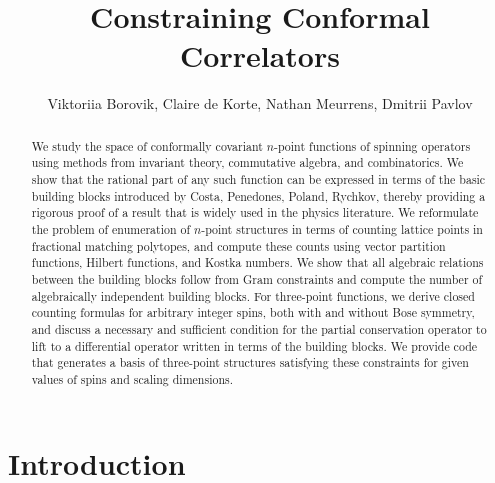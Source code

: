 \documentclass[12pt,a4paper]{extarticle}
\title{\bf Constraining Conformal Correlators}
\author{Viktoriia Borovik, Claire de Korte, Nathan Meurrens, Dmitrii Pavlov}
\date{}
\theoremstyle{definition}
\begin{document}
\maketitle
\begin{abstract}
We study the space of 
conformally covariant 
$n$-point functions of spinning ope\-rators using methods from invariant theory, commutative algebra, and combinatorics. We show that the rational part of any such function can be expressed in terms of the basic building blocks introduced by Costa, Penedones, Poland, Rychkov, thereby providing  a rigorous proof of a result 
that is widely used in the physics literature. We 
reformulate the problem of enumeration of 
$n$-point structures in terms of counting lattice points in fractional matching polytopes, and compute these counts using vector partition functions, Hilbert functions, and Kostka numbers. 
We show that all algebraic relations between the building blocks follow from Gram constraints and compute the number of algebraically independent building blocks. 
For three-point functions, we derive closed counting formulas for arbitrary integer spins, both with and without  Bose symmetry, and discuss a necessary and sufficient condition for the partial conservation operator to lift to a differential operator written in terms of the building blocks. We provide code that generates a basis of three-point structures satisfying these constraints for given values of spins and scaling dimensions.
\end{abstract}


\begingroup
\hypersetup{linkcolor=black}
\setcounter{tocdepth}{1}
\tableofcontents
\endgroup

\newpage

\section{Introduction}
\end{document}
